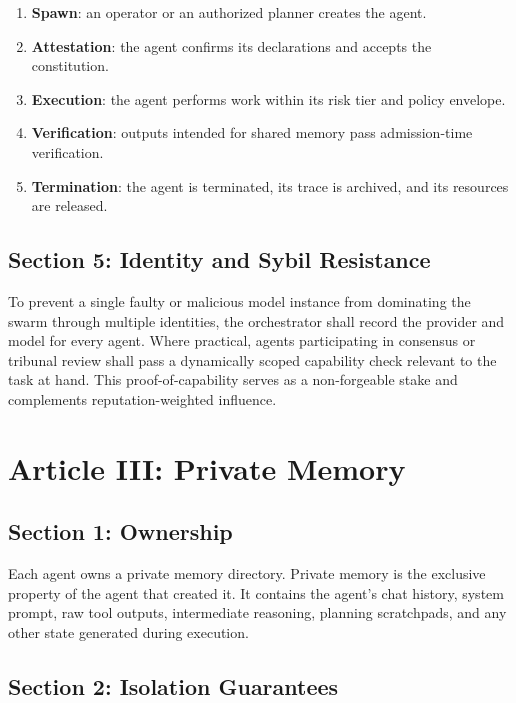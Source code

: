 \documentclass[12pt,letterpaper]{article}
\begin{document}
\begin{enumerate}
    \item \textbf{Spawn}: an operator or an authorized planner creates the agent.
    \item \textbf{Attestation}: the agent confirms its declarations and accepts the constitution.
    \item \textbf{Execution}: the agent performs work within its risk tier and policy envelope.
    \item \textbf{Verification}: outputs intended for shared memory pass admission-time verification.
    \item \textbf{Termination}: the agent is terminated, its trace is archived, and its resources are released.
\end{enumerate}

\subsection{Section 5: Identity and Sybil Resistance}

To prevent a single faulty or malicious model instance from dominating the swarm through multiple identities, the orchestrator shall record the provider and model for every agent. Where practical, agents participating in consensus or tribunal review shall pass a dynamically scoped capability check relevant to the task at hand. This proof-of-capability serves as a non-forgeable stake and complements reputation-weighted influence.

\section{Article III: Private Memory}
\label{art:private-memory}

\subsection{Section 1: Ownership}

Each agent owns a private memory directory. Private memory is the exclusive property of the agent that created it. It contains the agent's chat history, system prompt, raw tool outputs, intermediate reasoning, planning scratchpads, and any other state generated during execution.

\subsection{Section 2: Isolation Guarantees}
\end{document}
